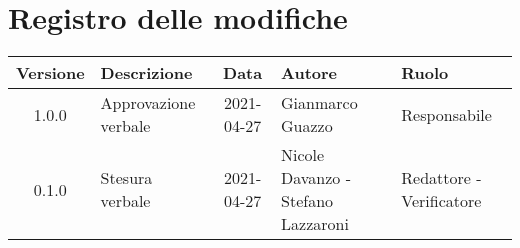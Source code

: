 \section*{Registro delle modifiche}

\begin{center}
	\begin{longtable}{|c|p{4cm}|c|p{3cm}|p{3cm}|}
		\hline
		\rowcolor{lighter-grayer}
		\textbf{Versione} & \textbf{Descrizione} & \textbf{Data} & \textbf{Autore} & \textbf{Ruolo} \\
		\hline
		\endfirsthead


		\hline
		1.0.0 & Approvazione verbale & 2021-04-27 & Gianmarco Guazzo & Responsabile \\
		0.1.0 & Stesura verbale & 2021-04-27 & Nicole Davanzo - Stefano Lazzaroni & Redattore - Verificatore \\
		\hline
	\end{longtable}
\end{center}